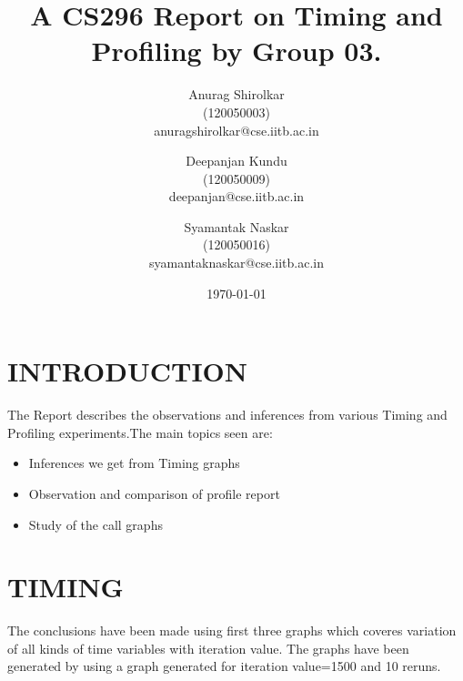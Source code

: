 \documentclass[11pt]{article}
\begin{document}
\title{A CS296 Report on Timing and Profiling by Group 03.}
\date{\today}
\author{Anurag Shirolkar \\ (120050003) \\ anuragshirolkar@cse.iitb.ac.in
        \and Deepanjan Kundu \\ (120050009) \\ deepanjan@cse.iitb.ac.in
        \and Syamantak Naskar \\ (120050016) \\ syamantaknaskar@cse.iitb.ac.in}
\maketitle
\section{INTRODUCTION}
The Report describes the observations and inferences from various Timing and Profiling experiments.The main topics seen are:
\begin{itemize}
\item Inferences we get from Timing graphs
\item Observation and comparison of profile report
\item Study of the call graphs
\end{itemize}
\section{TIMING}
The conclusions have been made using first three graphs which coveres variation of all kinds of time variables with iteration value.
The graphs have been generated by using a graph generated for iteration value=1500 and 10 reruns.
\end{document}

